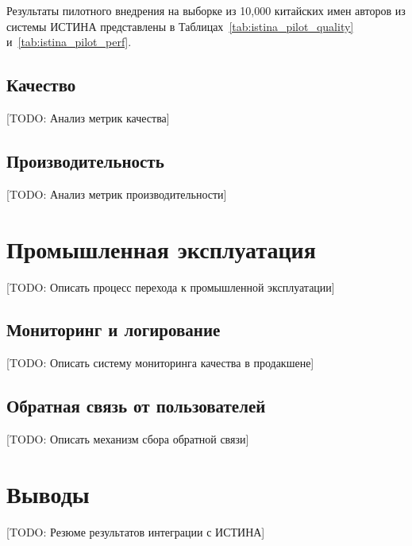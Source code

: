 Результаты пилотного внедрения на выборке из 10,000 китайских имен авторов из системы ИСТИНА представлены в Таблицах~\ref{tab:istina_pilot_quality} и~\ref{tab:istina_pilot_perf}.

\subsection{Качество}
\label{subsec:istina:quality}



[TODO: Анализ метрик качества]

\subsection{Производительность}
\label{subsec:istina:performance}



[TODO: Анализ метрик производительности]

\section{Промышленная эксплуатация}
\label{sec:istina:production}

[TODO: Описать процесс перехода к промышленной эксплуатации]

\subsection{Мониторинг и логирование}
\label{subsec:istina:monitoring}

[TODO: Описать систему мониторинга качества в продакшене]

\subsection{Обратная связь от пользователей}
\label{subsec:istina:feedback}

[TODO: Описать механизм сбора обратной связи]

\section{Выводы}
\label{sec:istina:conclusions}

[TODO: Резюме результатов интеграции с ИСТИНА]
